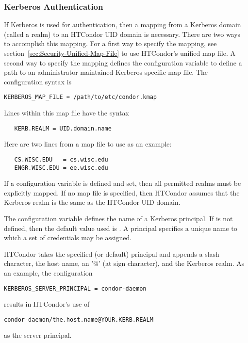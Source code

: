 \subsubsection{\label{sec:Kerberos-Authentication}Kerberos Authentication}

If Kerberos is used for authentication,
then a mapping from a
Kerberos domain (called a realm) to an HTCondor UID domain is necessary.
There are two ways to accomplish this mapping.
For a first way to specify the mapping, see
section~\ref{sec:Security-Unified-Map-File}
to use HTCondor's unified map file.
A second way to specify the mapping defines
the configuration variable
to define a path to an administrator-maintained Kerberos-specific 
map file.
The configuration syntax is
\begin{verbatim}
KERBEROS_MAP_FILE = /path/to/etc/condor.kmap
\end{verbatim}

Lines within this map file have the syntax
\begin{verbatim}
   KERB.REALM = UID.domain.name
\end{verbatim}

Here are two lines from a map file to use as an example:
\begin{verbatim}
   CS.WISC.EDU   = cs.wisc.edu
   ENGR.WISC.EDU = ee.wisc.edu
\end{verbatim}

If a 
configuration variable is defined and set,
then all permitted realms must be explicitly mapped.
If no map file is specified, then HTCondor assumes that the
Kerberos realm is the same as the HTCondor UID domain.

The configuration variable
defines the name of a Kerberos principal.
If  is not defined,
then the default value used is \verb@host@.
A principal specifies a unique name to which a set of credentials
may be assigned.

HTCondor takes the specified (or default) principal and appends
a slash character, the host name, an '@' (at sign character),
and the Kerberos realm.
As an example, the configuration
\begin{verbatim}
KERBEROS_SERVER_PRINCIPAL = condor-daemon
\end{verbatim}
results in HTCondor's use of
\begin{verbatim}
condor-daemon/the.host.name@YOUR.KERB.REALM
\end{verbatim}
as the server principal.

